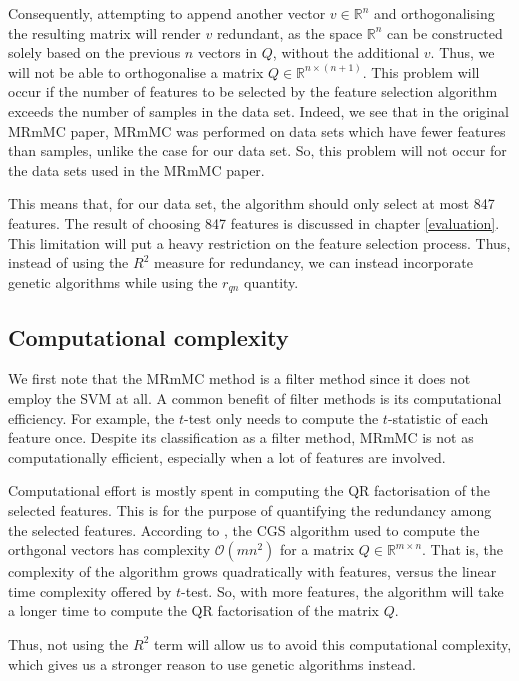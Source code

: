 \documentclass[12pt, twoside, a4paper]{report}
\begin{document}
Consequently, attempting to append another vector $v \in \mathbb{R}^{n}$ and orthogonalising the resulting matrix will render $v$ redundant, as the space $\mathbb{R}^{n}$ can be constructed solely based on the previous $n$ vectors in $Q$, without the additional $v$. Thus, we will not be able to orthogonalise a matrix $Q \in \mathbb{R}^{n \times (n+1)}$. This problem will occur if the number of features to be selected by the feature selection algorithm exceeds the number of samples in the data set. Indeed, we see that in the original MRmMC paper, MRmMC was performed on data sets which have fewer features than samples, unlike the case for our data set. So, this problem will not occur for the data sets used in the MRmMC paper.

This means that, for our data set, the algorithm should only select at most 847 features. The result of choosing 847 features is discussed in chapter \ref{evaluation}. This limitation will put a heavy restriction on the feature selection process. Thus, instead of using the $R^2$ measure for redundancy, we can instead incorporate genetic algorithms while using the $r_{qn}$ quantity.

\subsection{Computational complexity}

We first note that the MRmMC method is a filter method since it does not employ the SVM at all. A common benefit of filter methods is its computational efficiency. For example, the $t$-test only needs to compute the $t$-statistic of each feature once. Despite its classification as a filter method, MRmMC is not as computationally efficient, especially when a lot of features are involved.

Computational effort is mostly spent in computing the QR factorisation of the selected features. This is for the purpose of quantifying the redundancy among the selected features. According to \cite{RefWorks:253}, the CGS algorithm used to compute the orthgonal vectors has complexity $\mathcal{O}(mn^2)$ for a matrix $Q \in \mathbb{R}^{m \times n}$. That is, the complexity of the algorithm grows quadratically with features, versus the linear time complexity offered by $t$-test. So, with more features, the algorithm will take a longer time to compute the QR factorisation of the matrix $Q$.

Thus, not using the $R^2$ term will allow us to avoid this computational complexity, which gives us a stronger reason to use genetic algorithms instead.
\end{document}
